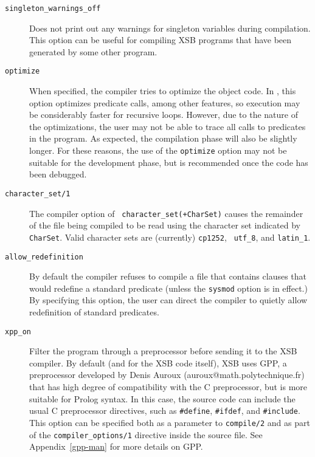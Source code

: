 \begin{description}
\item[{\tt singleton\_warnings\_off}] Does not print out any warnings
  for singleton variables during compilation.  This option can be
  useful for compiling XSB programs that have been generated by some
  other program.
%
\item[{\tt optimize}] When specified, the
  compiler tries to optimize the object code.  In \version, this
  option optimizes predicate calls, among other features, so execution
  may be considerably faster for recursive loops.  However, due to the
  nature of the optimizations, the user may not be able to trace all
  calls to predicates in the program.  As expected, the compilation
  phase will also be slightly longer.  For these reasons, the use of
  the {\tt optimize} option may not be suitable for the development
  phase, but is recommended once the code has been debugged.
%
\item[{\tt character\_set/1}]  The compiler option of {\tt
  character\_set(+CharSet)} causes the remainder of the file being
  compiled to be read using the character set indicated by {\tt
    CharSet}.  Valid character sets are (currently) {\tt cp1252}, {\tt
    utf\_8}, and {\tt latin\_1}.
%
\item[{\tt allow\_redefinition}] 
	By default the compiler refuses to compile a file that
	contains clauses that would redefine a standard predicate
	(unless the {\tt sysmod} option is in effect.)  By specifying
	this option, the user can direct the compiler to quietly allow
	redefinition of standard predicates.
%
\item[{\tt xpp\_on}] Filter the program through a
  preprocessor before sending it to the XSB compiler. By default (and
  for the XSB code itself), XSB uses GPP, a preprocessor developed by
  Denis Auroux (auroux@math.polytechnique.fr) that has high degree of
  compatibility with the C preprocessor, but is more suitable for
  Prolog syntax. In this case, the source code can include the usual C
  preprocessor directives, such as \verb|#define|, \verb|#ifdef|, and
  \verb|#include|. This option can be specified both as a parameter to
       {\tt compile/2} and as part of the {\tt compiler\_options/1}
       directive inside the source file. See Appendix~\ref{gpp-man}
       for more details on GPP.


\end{description}
